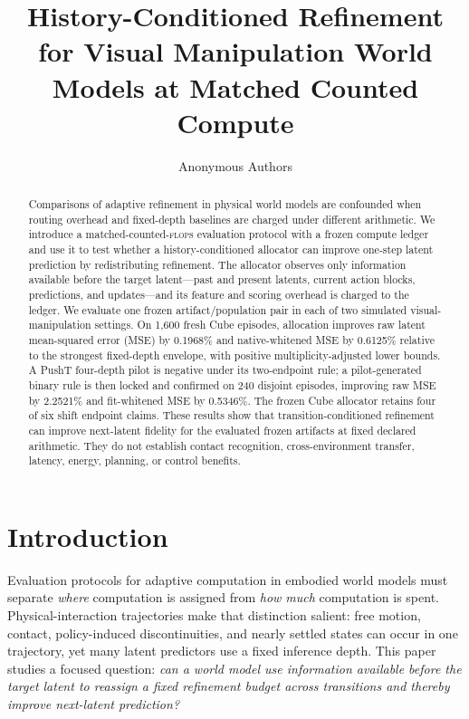 \documentclass{article}
\title{History-Conditioned Refinement for Visual Manipulation World Models at Matched Counted Compute}
\author{Anonymous Authors}
\newcommand{\flops}{\textsc{flop}s}
\begin{document}
\maketitle

\begin{abstract}
Comparisons of adaptive refinement in physical world models are confounded when routing overhead and fixed-depth baselines are charged under different arithmetic. We introduce a matched-counted-\flops{} evaluation protocol with a frozen compute ledger and use it to test whether a history-conditioned allocator can improve one-step latent prediction by redistributing refinement. The allocator observes only information available before the target latent---past and present latents, current action blocks, predictions, and updates---and its feature and scoring overhead is charged to the ledger. We evaluate one frozen artifact/population pair in each of two simulated visual-manipulation settings. On 1,600 fresh Cube episodes, allocation improves raw latent mean-squared error (MSE) by 0.1968\% and native-whitened MSE by 0.6125\% relative to the strongest fixed-depth envelope, with positive multiplicity-adjusted lower bounds. A PushT four-depth pilot is negative under its two-endpoint rule; a pilot-generated binary rule is then locked and confirmed on 240 disjoint episodes, improving raw MSE by 2.2521\% and fit-whitened MSE by 0.5346\%. The frozen Cube allocator retains four of six shift endpoint claims. These results show that transition-conditioned refinement can improve next-latent fidelity for the evaluated frozen artifacts at fixed declared arithmetic. They do not establish contact recognition, cross-environment transfer, latency, energy, planning, or control benefits.
\end{abstract}

\section{Introduction}

Evaluation protocols for adaptive computation in embodied world models must separate \emph{where} computation is assigned from \emph{how much} computation is spent. Physical-interaction trajectories make that distinction salient: free motion, contact, policy-induced discontinuities, and nearly settled states can occur in one trajectory, yet many latent predictors use a fixed inference depth. This paper studies a focused question: \emph{can a world model use information available before the target latent to reassign a fixed refinement budget across transitions and thereby improve next-latent prediction?}
\end{document}
